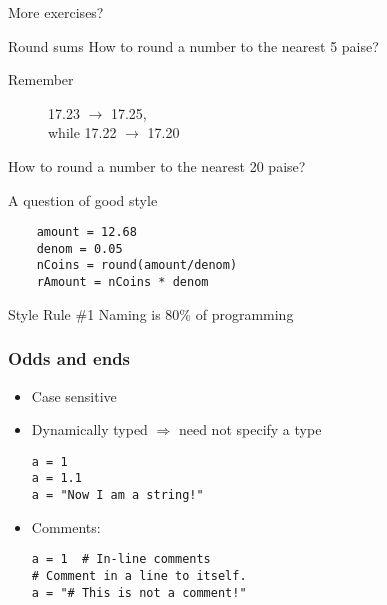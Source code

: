 \documentclass[14pt,compress]{beamer}
\newcounter{time}
\newcommand{\inctime}[1]{\addtocounter{time}{#1}{\tiny \thetime\ m}}
\begin{document}
\begin{frame}{More exercises?}
  \begin{center}
    \begin{block}{Round sums}
      How to round a number to the nearest  5 paise?\\
      \begin{description}
        \item[Remember] 17.23 $\rightarrow$ 17.25,\\ while 17.22 $\rightarrow$ 17.20\\
      \end{description}
      How to round a number to the nearest 20 paise?
    \end{block}
  \end{center}
\end{frame}

\begin{frame}[fragile] {A question of good style}
  \begin{lstlisting}
    amount = 12.68
    denom = 0.05
    nCoins = round(amount/denom)
    rAmount = nCoins * denom
  \end{lstlisting}
  \pause
  \begin{block}{Style Rule \#1}
    Naming is 80\% of programming
  \end{block}
\end{frame}


\begin{frame}[fragile]
  \frametitle{Odds and ends}
  \begin{itemize}
    \item Case sensitive
    \item Dynamically typed $\Rightarrow$ need not specify a type
      \begin{lstlisting}
a = 1
a = 1.1
a = "Now I am a string!"
      \end{lstlisting}
    \item Comments:
      \begin{lstlisting}
a = 1  # In-line comments
# Comment in a line to itself.
a = "# This is not a comment!"
      \end{lstlisting}
  \end{itemize}
  \inctime{15}
\end{frame}

\end{document}
